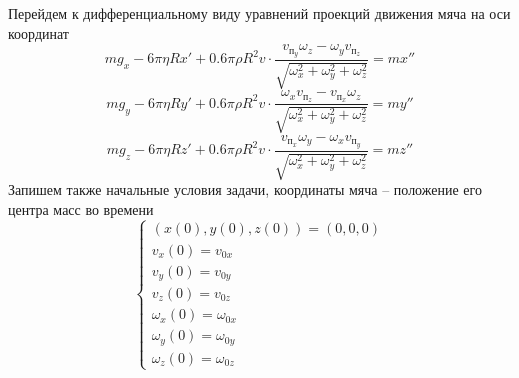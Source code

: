 \documentclass[a5paper, 10pt]{article}
\theoremstyle{definition}
\theoremstyle{plain}
\theoremstyle{remark}
\begin{document}
Перейдем к дифференциальному виду уравнений проекций движения мяча на оси координат
\begin{equation}
m g_{x} - 6 \pi  \eta R x' +0.6 \pi \rho  R^{2} v  \cdot  \frac{ v_{\text{п}_{y}} \omega _{z} - \omega _{y} v_{\text{п}_{z}}}{  \sqrt{\omega _{x}^2+\omega _{y}^2+\omega _{z}^2}} = m x''
\end{equation}
\begin{equation}
m g_{y} - 6 \pi  \eta R y' +0.6 \pi \rho  R^{2} v  \cdot  \frac{ \omega _{x} v_{\text{п}_{z}} - v_{\text{п}_{x}} \omega _{z}}{ \sqrt{\omega _{x}^2+\omega _{y}^2+\omega _{z}^2}} = m y''
\end{equation}
\begin{equation}
m g_{z} - 6 \pi  \eta R z' +0.6 \pi \rho  R^{2} v  \cdot  \frac{v_{\text{п}_{x}} \omega _{y} - \omega _{x} v_{\text{п}_{y}} }{ \sqrt{\omega _{x}^2+\omega _{y}^2+\omega _{z}^2}} = m z''
\end{equation}
Запишем также начальные условия задачи, координаты мяча -- положение его центра масс во времени
\begin{equation}
\begin{cases}
\left(x (0), y(0), z(0) \right)  = \left(0, 0, 0\right)\\
v_{x} (0) = v_{0x}\\
v_{y} (0) = v_{0y}\\
v_{z} (0) = v_{0z}\\
\omega_{x} (0) = \omega_{0x}\\
\omega_{y} (0) = \omega_{0y}\\
\omega_{z} (0) = \omega_{0z}
\end{cases}
\end{equation}
\end{document}
